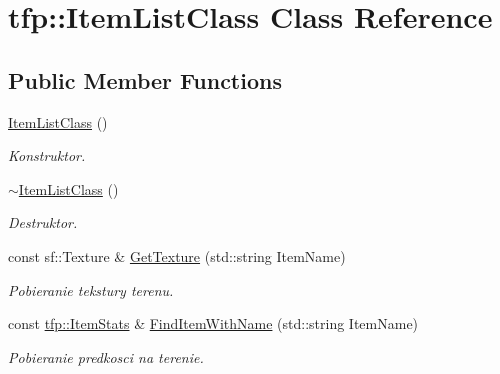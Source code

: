 \hypertarget{classtfp_1_1_item_list_class}{}\section{tfp\+:\+:Item\+List\+Class Class Reference}
\label{classtfp_1_1_item_list_class}
\subsection*{Public Member Functions}
\begin{DoxyCompactItemize}
\item 
\mbox{\label{classtfp_1_1_item_list_class_a946a13a93354029c05c04c61f4be904b}} 
\mbox{\hyperlink{classtfp_1_1_item_list_class_a946a13a93354029c05c04c61f4be904b}{Item\+List\+Class}} ()
\begin{DoxyCompactList}\small\item\em Konstruktor. \end{DoxyCompactList}\item 
\mbox{\label{classtfp_1_1_item_list_class_afcde05033753dc405b8b9d2d0855d958}} 
\mbox{\hyperlink{classtfp_1_1_item_list_class_afcde05033753dc405b8b9d2d0855d958}{$\sim$\+Item\+List\+Class}} ()
\begin{DoxyCompactList}\small\item\em Destruktor. \end{DoxyCompactList}\item 
\mbox{\label{classtfp_1_1_item_list_class_a3db4b7fefcdd0eaceba9c434cfb5c1c1}} 
const sf\+::\+Texture \& \mbox{\hyperlink{classtfp_1_1_item_list_class_a3db4b7fefcdd0eaceba9c434cfb5c1c1}{Get\+Texture}} (std\+::string Item\+Name)
\begin{DoxyCompactList}\small\item\em Pobieranie tekstury terenu. \end{DoxyCompactList}\item 
\mbox{\label{classtfp_1_1_item_list_class_a58147c202521e386fb0476b00572d596}} 
const \mbox{\hyperlink{structtfp_1_1_item_stats}{tfp\+::\+Item\+Stats}} \& \mbox{\hyperlink{classtfp_1_1_item_list_class_a58147c202521e386fb0476b00572d596}{Find\+Item\+With\+Name}} (std\+::string Item\+Name)
\begin{DoxyCompactList}\small\item\em Pobieranie predkosci na terenie. \end{DoxyCompactList}\item 

\end{DoxyCompactItemize}
